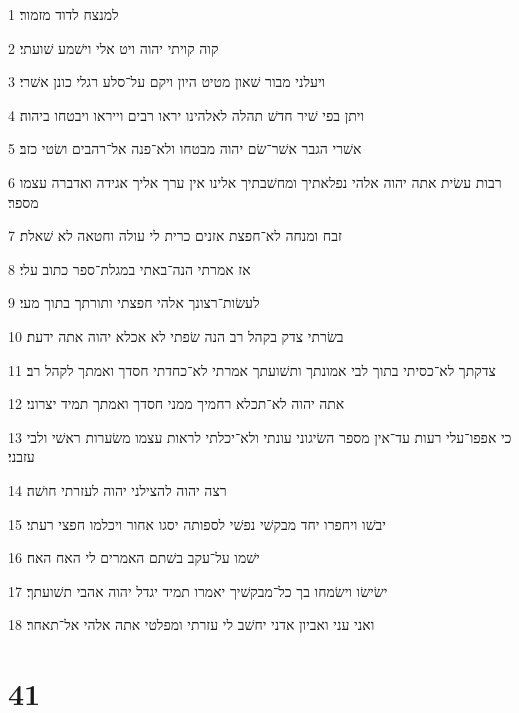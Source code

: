 \par 1 למנצח לדוד מזמור׃
\par 2 קוה קויתי יהוה ויט אלי וישׁמע שׁועתי׃
\par 3 ויעלני מבור שׁאון מטיט היון ויקם על־סלע רגלי כונן אשׁרי׃
\par 4 ויתן בפי שׁיר חדשׁ תהלה לאלהינו יראו רבים וייראו ויבטחו ביהוה׃
\par 5 אשׁרי הגבר אשׁר־שׂם יהוה מבטחו ולא־פנה אל־רהבים ושׂטי כזב׃
\par 6 רבות עשׂית אתה יהוה אלהי נפלאתיך ומחשׁבתיך אלינו אין ערך אליך אגידה ואדברה עצמו מספר׃
\par 7 זבח ומנחה לא־חפצת אזנים כרית לי עולה וחטאה לא שׁאלת׃
\par 8 אז אמרתי הנה־באתי במגלת־ספר כתוב עלי׃
\par 9 לעשׂות־רצונך אלהי חפצתי ותורתך בתוך מעי׃
\par 10 בשׂרתי צדק בקהל רב הנה שׂפתי לא אכלא יהוה אתה ידעת׃
\par 11 צדקתך לא־כסיתי בתוך לבי אמונתך ותשׁועתך אמרתי לא־כחדתי חסדך ואמתך לקהל רב׃
\par 12 אתה יהוה לא־תכלא רחמיך ממני חסדך ואמתך תמיד יצרוני׃
\par 13 כי אפפו־עלי רעות עד־אין מספר השׂיגוני עונתי ולא־יכלתי לראות עצמו משׂערות ראשׁי ולבי עזבני׃
\par 14 רצה יהוה להצילני יהוה לעזרתי חושׁה׃
\par 15 יבשׁו ויחפרו יחד מבקשׁי נפשׁי לספותה יסגו אחור ויכלמו חפצי רעתי׃
\par 16 ישׁמו על־עקב בשׁתם האמרים לי האח האח׃
\par 17 ישׂישׂו וישׂמחו בך כל־מבקשׁיך יאמרו תמיד יגדל יהוה אהבי תשׁועתך׃
\par 18 ואני עני ואביון אדני יחשׁב לי עזרתי ומפלטי אתה אלהי אל־תאחר׃

\chapter{41}

